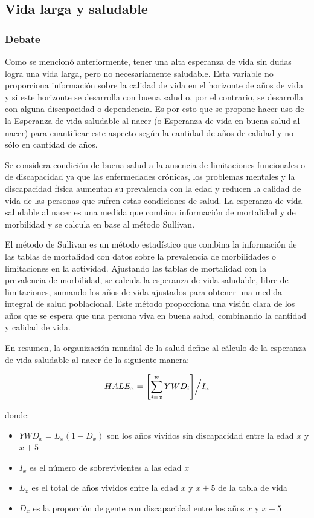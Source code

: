 \documentclass[
  10pt,
]{article}
\begin{document}
\subsection{Vida larga y saludable}\label{vida-larga-y-saludable-1}

\subsubsection{Debate}\label{debate}

Como se mencionó anteriormente, tener una alta esperanza de vida sin
dudas logra una vida larga, pero no necesariamente saludable. Esta
variable no proporciona información sobre la calidad de vida en el
horizonte de años de vida y si este horizonte se desarrolla con buena
salud o, por el contrario, se desarrolla con alguna discapacidad o
dependencia. Es por esto que se propone hacer uso de la Esperanza de
vida saludable al nacer (o Esperanza de vida en buena salud al nacer)
para cuantificar este aspecto según la cantidad de años de calidad y no
sólo en cantidad de años.

Se considera condición de buena salud a la ausencia de limitaciones
funcionales o de discapacidad ya que las enfermedades crónicas, los
problemas mentales y la discapacidad física aumentan su prevalencia con
la edad y reducen la calidad de vida de las personas que sufren estas
condiciones de salud. La esperanza de vida saludable al nacer es una
medida que combina información de mortalidad y de morbilidad y se
calcula en base al método Sullivan.

El método de Sullivan es un método estadístico que combina la
información de las tablas de mortalidad con datos sobre la prevalencia
de morbilidades o limitaciones en la actividad. Ajustando las tablas de
mortalidad con la prevalencia de morbilidad, se calcula la esperanza de
vida saludable, libre de limitaciones, sumando los años de vida
ajustados para obtener una medida integral de salud poblacional. Este
método proporciona una visión clara de los años que se espera que una
persona viva en buena salud, combinando la cantidad y calidad de vida.

En resumen, la organización mundial de la salud define al cálculo de la
esperanza de vida saludable al nacer de la siguiente manera:

\[HALE_x = \Biggl[\sum_{i=x}^w YWD_i\Biggl] \Bigl/ I_x\]

donde:

\begin{itemize}
\item
  \(YWD_x = L_x (1-D_x)\) son los años vividos sin discapacidad entre la
  edad \(x\) y \(x+5\)
\item
  \(I_x\) es el número de sobrevivientes a las edad \(x\)
\item
  \(L_x\) es el total de años vividos entre la edad \(x\) y \(x+5\) de
  la tabla de vida
\item
  \(D_x\) es la proporción de gente con discapacidad entre los años
  \(x\) y \(x+5\)
\end{itemize}
\end{document}
